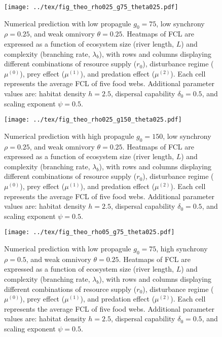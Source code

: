 \begin{figure}
\centering
\texttt{[image: ../tex/fig\_theo\_rho025\_g75\_theta025.pdf]}
\caption{Numerical prediction with low propagule \(g_0 = 75\), low
synchrony \(\rho = 0.25\), and weak omnivory \(\theta = 0.25\). Heatmaps
of FCL are expressed as a function of ecosystem size (river length,
\(L\)) and complexity (branching rate, \(\lambda_b\)), with rows and
columns displaying different combinations of resource supply (\(r_0\)),
disturbance regime (\(\mu^{(0)}\)), prey effect (\(\mu^{(1)}\)), and
predation effect (\(\mu^{(2)}\)). Each cell represents the average FCL
of five food webs. Additional parameter values are: habitat density
\(h=2.5\), dispersal capability \(\delta_0=0.5\), and scaling exponent
\(\psi=0.5\).}
\end{figure}

\newpage

\begin{figure}
\centering
\texttt{[image: ../tex/fig\_theo\_rho025\_g150\_theta025.pdf]}
\caption{Numerical prediction with high propagule \(g_0 = 150\), low
synchrony \(\rho = 0.25\), and weak omnivory \(\theta = 0.25\). Heatmaps
of FCL are expressed as a function of ecosystem size (river length,
\(L\)) and complexity (branching rate, \(\lambda_b\)), with rows and
columns displaying different combinations of resource supply (\(r_0\)),
disturbance regime (\(\mu^{(0)}\)), prey effect (\(\mu^{(1)}\)), and
predation effect (\(\mu^{(2)}\)). Each cell represents the average FCL
of five food webs. Additional parameter values are: habitat density
\(h=2.5\), dispersal capability \(\delta_0=0.5\), and scaling exponent
\(\psi=0.5\).}
\end{figure}

\newpage

\begin{figure}
\centering
\texttt{[image: ../tex/fig\_theo\_rho05\_g75\_theta025.pdf]}
\caption{Numerical prediction with low propagule \(g_0 = 75\), high
synchrony \(\rho = 0.5\), and weak omnivory \(\theta = 0.25\). Heatmaps
of FCL are expressed as a function of ecosystem size (river length,
\(L\)) and complexity (branching rate, \(\lambda_b\)), with rows and
columns displaying different combinations of resource supply (\(r_0\)),
disturbance regime (\(\mu^{(0)}\)), prey effect (\(\mu^{(1)}\)), and
predation effect (\(\mu^{(2)}\)). Each cell represents the average FCL
of five food webs. Additional parameter values are: habitat density
\(h=2.5\), dispersal capability \(\delta_0=0.5\), and scaling exponent
\(\psi=0.5\).}
\end{figure}

